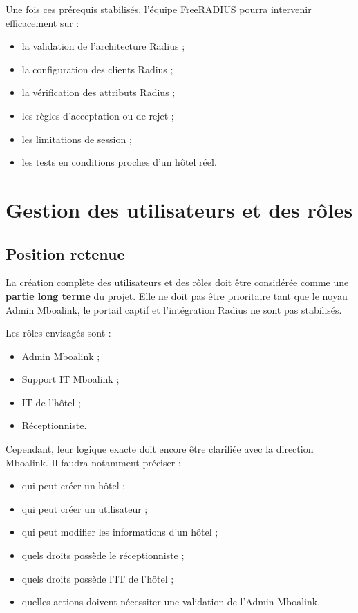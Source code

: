 \documentclass[12pt,a4paper]{article}
\begin{document}
Une fois ces prérequis stabilisés, l'équipe FreeRADIUS pourra intervenir efficacement sur :

\begin{itemize}
  \item la validation de l'architecture Radius ;
  \item la configuration des clients Radius ;
  \item la vérification des attributs Radius ;
  \item les règles d'acceptation ou de rejet ;
  \item les limitations de session ;
  \item les tests en conditions proches d'un hôtel réel.
\end{itemize}

\section{Gestion des utilisateurs et des rôles}

\subsection{Position retenue}

La création complète des utilisateurs et des rôles doit être considérée comme une \textbf{partie long terme} du projet. Elle ne doit pas être prioritaire tant que le noyau Admin Mboalink, le portail captif et l'intégration Radius ne sont pas stabilisés.

Les rôles envisagés sont :

\begin{itemize}
  \item Admin Mboalink ;
  \item Support IT Mboalink ;
  \item IT de l'hôtel ;
  \item Réceptionniste.
\end{itemize}

Cependant, leur logique exacte doit encore être clarifiée avec la direction Mboalink. Il faudra notamment préciser :

\begin{itemize}
  \item qui peut créer un hôtel ;
  \item qui peut créer un utilisateur ;
  \item qui peut modifier les informations d'un hôtel ;
  \item quels droits possède le réceptionniste ;
  \item quels droits possède l'IT de l'hôtel ;
  \item quelles actions doivent nécessiter une validation de l'Admin Mboalink.
\end{itemize}
\end{document}
